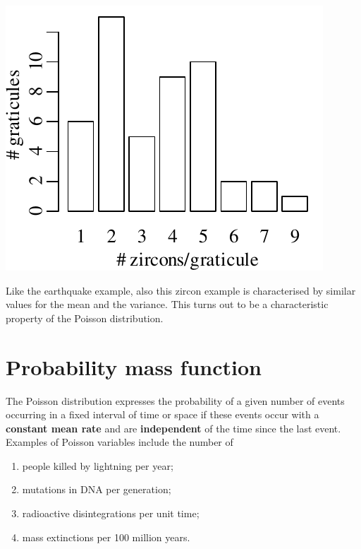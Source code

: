 \noindent\begin{minipage}[t][][b]{.3\textwidth}
  \includegraphics[]{../figures/zirconhist.pdf}\medskip
\end{minipage}
\begin{minipage}[t][][t]{.7\textwidth}
  \label{fig:zirconhist}
\end{minipage}

Like the earthquake example, also this zircon example is characterised
by similar values for the mean and the variance. This turns out to be
a characteristic property of the Poisson distribution.

\section{Probability mass function}
\label{sec:PMF}

The Poisson distribution expresses the probability of a given number
of events occurring in a fixed interval of time or space if these
events occur with a \textbf{constant mean rate} and are
\textbf{independent} of the time since the last event. Examples of
Poisson variables include the number of

\begin{enumerate}
\item people killed by lightning per year;
\item mutations in DNA per generation;
\item radioactive disintegrations per unit time;
\item mass extinctions per 100 million years.
\end{enumerate}

